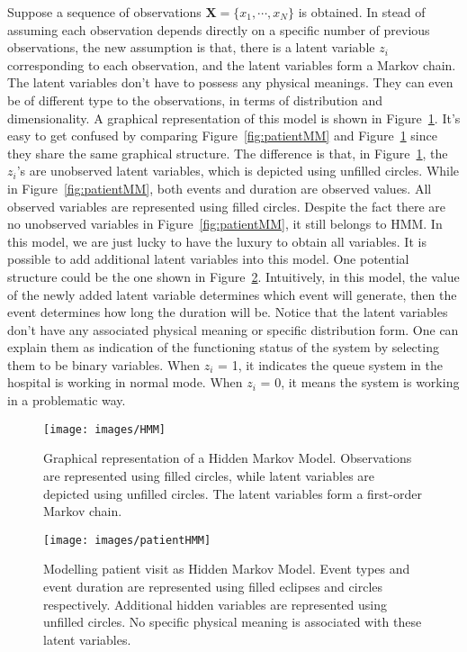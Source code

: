 Suppose a sequence of observations \(\mathbf{X} = \{x_1, \cdots, x_N\}\) is obtained. In stead of assuming each observation depends directly on a specific number of previous observations, the new assumption is that, there is a latent variable \(z_i\) corresponding to each observation, and the latent variables form a Markov chain. The latent variables don't have to possess any physical meanings. They can even be of different type to the observations, in terms of distribution and dimensionality. A graphical representation of this model is shown in Figure~\ref{fig:HMM}. It's easy to get confused by comparing Figure~\ref{fig:patientMM} and Figure~\ref{fig:HMM} since they share the same graphical structure. The difference is that, in Figure~\ref{fig:HMM}, the \(z_i\)'s are unobserved latent variables, which is depicted using unfilled circles. While in Figure~\ref{fig:patientMM}, both events and duration are observed values. All observed variables are represented using filled circles. Despite the fact there are no unobserved variables in Figure~\ref{fig:patientMM}, it still belongs to HMM. In this model, we are just lucky to have the luxury to obtain all variables. It is possible to add additional latent variables into this model. One potential structure could be the one shown in Figure~\ref{fig:patientHMM}. Intuitively, in this model, the value of the newly added latent variable determines which event will generate, then the event determines how long the duration will be. Notice that the latent variables don't have any associated physical meaning or specific distribution form. One can explain them as indication of the functioning status of the system by selecting them to be binary variables. When \(z_i\) = 1, it indicates the queue system in the hospital is working in normal mode. When \(z_i\) = 0, it means the system is working in a problematic way.

\begin{figure}[!ht]
	\begin{center}
		\texttt{[image: images/HMM]}
		\caption{Graphical representation of a Hidden Markov Model. Observations are represented using filled circles, while latent variables are depicted using unfilled circles. The latent variables form a first-order Markov chain.}
		\label{fig:HMM}
	\end{center}
\end{figure}

\begin{figure}[!ht]
	\begin{center}
		\texttt{[image: images/patientHMM]}
		\caption{Modelling patient visit as Hidden Markov Model. Event types and event duration are represented using filled eclipses and circles respectively. Additional hidden variables are represented using unfilled circles. No specific physical meaning is associated with these latent variables.}
		\label{fig:patientHMM}
	\end{center}
\end{figure}

